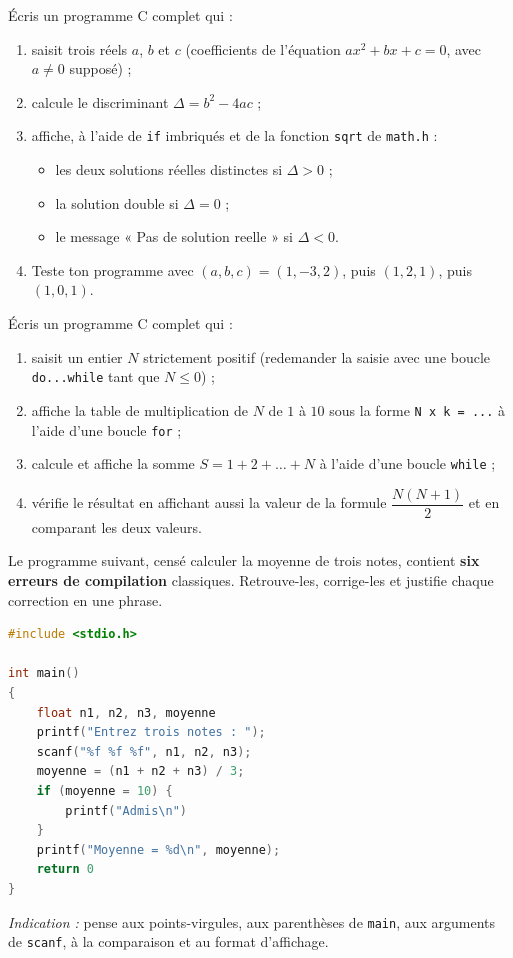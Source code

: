 \documentclass[11pt]{article}
\begin{document}
\begin{exercice}
Écris un programme C complet qui :
\begin{enumerate}
\item saisit trois réels $a$, $b$ et $c$ (coefficients de l'équation $ax^2 + bx + c = 0$, avec $a \neq 0$ supposé) ;
\item calcule le discriminant $\Delta = b^2 - 4ac$ ;
\item affiche, à l'aide de \texttt{if} imbriqués et de la fonction \texttt{sqrt} de \texttt{math.h} :
\begin{itemize}
\item les deux solutions réelles distinctes si $\Delta > 0$ ;
\item la solution double si $\Delta = 0$ ;
\item le message « Pas de solution reelle » si $\Delta < 0$.
\end{itemize}
\item Teste ton programme avec $(a, b, c) = (1, -3, 2)$, puis $(1, 2, 1)$, puis $(1, 0, 1)$.
\end{enumerate}
\end{exercice}

\begin{exercice}
Écris un programme C complet qui :
\begin{enumerate}
\item saisit un entier $N$ strictement positif (redemander la saisie avec une boucle \texttt{do...while} tant que $N \leq 0$) ;
\item affiche la table de multiplication de $N$ de $1$ à $10$ sous la forme \texttt{N x k = ...} à l'aide d'une boucle \texttt{for} ;
\item calcule et affiche la somme $S = 1 + 2 + \dots + N$ à l'aide d'une boucle \texttt{while} ;
\item vérifie le résultat en affichant aussi la valeur de la formule $\dfrac{N(N+1)}{2}$ et en comparant les deux valeurs.
\end{enumerate}
\end{exercice}

\begin{exercice}
Le programme suivant, censé calculer la moyenne de trois notes, contient \textbf{six erreurs de compilation} classiques. Retrouve-les, corrige-les et justifie chaque correction en une phrase.
\begin{lstlisting}[language=C]
#include <stdio.h>

int main()
{
    float n1, n2, n3, moyenne
    printf("Entrez trois notes : ");
    scanf("%f %f %f", n1, n2, n3);
    moyenne = (n1 + n2 + n3) / 3;
    if (moyenne = 10) {
        printf("Admis\n")
    }
    printf("Moyenne = %d\n", moyenne);
    return 0
}
\end{lstlisting}
\emph{Indication :} pense aux points-virgules, aux parenthèses de \texttt{main}, aux arguments de \texttt{scanf}, à la comparaison et au format d'affichage.
\end{exercice}
\end{document}

